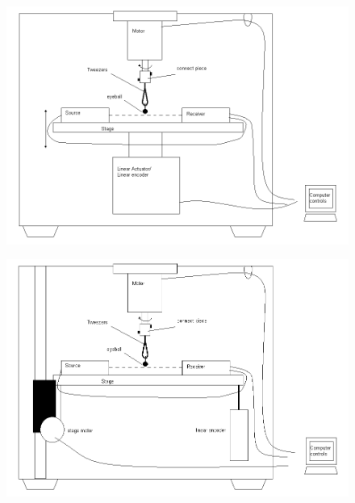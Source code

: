 \documentclass{article}
\begin{document}
\begin{figure}[h]
  \centering
  \includegraphics[width=\linewidth]{../img/schematic1}
  \label{fig:schematic1}
\end{figure}

\begin{figure}[h]
  \centering
  \includegraphics[width=\linewidth]{../img/schematic2}
  \label{fig:schematic2}
\end{figure}
\end{document}

